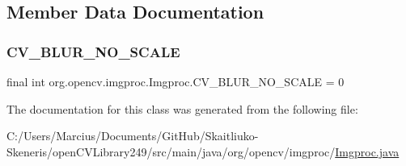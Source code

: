 \subsection{Member Data Documentation}
\mbox{\label{classorg_1_1opencv_1_1imgproc_1_1_imgproc_abf7d30bf7b45f87ff811c486d74a6e66}} 
\subsubsection{\texorpdfstring{C\+V\+\_\+\+B\+L\+U\+R\+\_\+\+N\+O\+\_\+\+S\+C\+A\+LE}{CV\_BLUR\_NO\_SCALE}}
{\footnotesize\ttfamily final int org.\+opencv.\+imgproc.\+Imgproc.\+C\+V\+\_\+\+B\+L\+U\+R\+\_\+\+N\+O\+\_\+\+S\+C\+A\+LE = 0\hspace{0.3cm}{\ttfamily [static]}}



The documentation for this class was generated from the following file\+:\begin{DoxyCompactItemize}
\item 
C\+:/\+Users/\+Marcius/\+Documents/\+Git\+Hub/\+Skaitliuko-\/\+Skeneris/open\+C\+V\+Library249/src/main/java/org/opencv/imgproc/\mbox{\hyperlink{_imgproc_8java}{Imgproc.\+java}}\end{DoxyCompactItemize}
